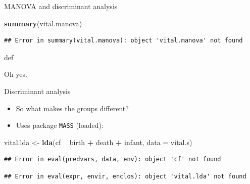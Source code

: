 \documentclass[ignorenonframetext,]{beamer}
\newenvironment{Shaded}{\begin{snugshade}}{\end{snugshade}}
\newcommand{\DataTypeTok}[1]{\textcolor[rgb]{0.13,0.29,0.53}{#1}}
\newcommand{\KeywordTok}[1]{\textcolor[rgb]{0.13,0.29,0.53}{\textbf{#1}}}
\newcommand{\NormalTok}[1]{#1}
\newcommand{\OperatorTok}[1]{\textcolor[rgb]{0.81,0.36,0.00}{\textbf{#1}}}
\newcommand{\StringTok}[1]{\textcolor[rgb]{0.31,0.60,0.02}{#1}}
\begin{document}
\begin{frame}[fragile]{MANOVA and discriminant analysis}
\begin{Shaded}
\begin{Highlighting}[]
\KeywordTok{summary}\NormalTok{(vital.manova)}
\end{Highlighting}
\end{Shaded}

\begin{verbatim}
## Error in summary(vital.manova): object 'vital.manova' not found
\end{verbatim}

def

Oh yes.

\end{frame}

\begin{frame}[fragile]{Discriminant analysis}
\protect\hypertarget{discriminant-analysis-4}{}

\begin{itemize}
\item
  So what makes the groups different?
\item
  Uses package \texttt{MASS} (loaded):
\end{itemize}

\begin{Shaded}
\begin{Highlighting}[]
\NormalTok{vital.lda <-}\StringTok{ }\KeywordTok{lda}\NormalTok{(cf }\OperatorTok{~}\StringTok{ }\NormalTok{birth }\OperatorTok{+}\StringTok{ }\NormalTok{death }\OperatorTok{+}\StringTok{ }\NormalTok{infant, }\DataTypeTok{data =}\NormalTok{ vital.s)}
\end{Highlighting}
\end{Shaded}

\begin{verbatim}
## Error in eval(predvars, data, env): object 'cf' not found
\end{verbatim}

\begin{Shaded}
\end{Shaded}

\begin{verbatim}
## Error in eval(expr, envir, enclos): object 'vital.lda' not found
\end{verbatim}

\begin{Shaded}
\end{Shaded}


\end{frame}
\end{document}
